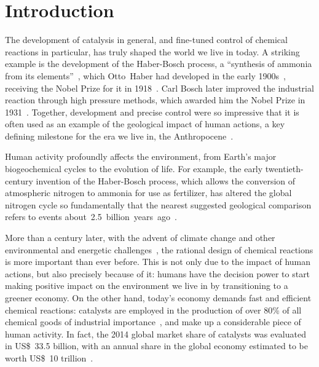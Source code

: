 \chapter*{Introduction}%
\label{ch:introduction}

The development of catalysis in general,
and fine-tuned control of chemical reactions in particular,
has truly shaped the world we live in today.
A striking example is the development of the Haber-Bosch process,
a ``synthesis of ammonia from its elements''~\cite{Nobel_1918},
which Otto~Haber had developed in the early 1900s~\cite{Erisman_2008,Lewis_2015},
receiving the Nobel Prize for it in 1918~\cite{Nobel_1918}.
Carl Bosch later improved the industrial reaction through high pressure methods,
which awarded him the Nobel Prize in 1931~\cite{Nobel_1931}.
Together,
development and precise control were so impressive that it is often used
as an example of the geological impact of human actions,
a key defining milestone for
the era we live in,
the Anthropocene~\cite{Smil_1999,Canfield_2010,Lewis_2015}.
%
\begin{citacao}
	Human activity profoundly affects the environment,
	from Earth’s major biogeochemical cycles to the evolution of life.
	For example,
	the early twentieth-century invention of the Haber-Bosch process,
	which allows the conversion of atmospheric nitrogen to ammonia for use as fertilizer,
	has altered the global nitrogen cycle so fundamentally
	that the nearest suggested geological comparison refers to events
	about~2.5~billion~years~ago~\cite{Lewis_2015}.
\end{citacao}

More than a century later,
with the advent of climate change and other environmental and energetic challenges~\cite{Bertozzi_2016},
the rational design of chemical reactions is more important than ever before.
This is not only due to the impact of human actions,
but also precisely because of it:
humans have the decision power to start making positive impact on the environment we live in
by transitioning to a greener economy.
On the other hand,
today's economy demands fast and efficient chemical reactions:
catalysts are employed in the production of over 80\% of all chemical
goods of industrial
importance~\cite{Breakthrough_Catalyst,GlobalCatalystMarket},
and make up a considerable piece of human activity.
In fact,
the 2014 global market share of catalysts was evaluated in US\$~33.5 billion,
with an annual share in the global economy estimated to be worth US\$~10
trillion~\cite{GlobalCatalystMarket}.

